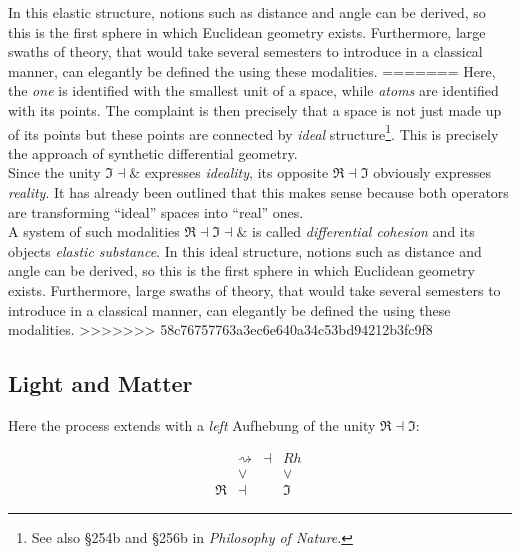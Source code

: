 \documentclass{article}
\begin{document}
In this elastic structure, notions such as distance and angle can be derived, so this is the first sphere in
which Euclidean geometry exists. Furthermore, large swaths of theory, that would take several semesters to
introduce in a classical manner, can elegantly be defined the using these modalities.
=======
Here, the \emph{one} is identified with the smallest unit of a space, while \emph{atoms} are identified
with its points. The complaint is then precisely that a space is not just made up of its points but these
points are connected by \emph{ideal} structure\footnote{See also §254b and §256b in \emph{Philosophy of
Nature}.}. This is precisely the approach of synthetic differential geometry. \\

Since the unity $\Im\dashv\&$ expresses \emph{ideality}, its opposite $\Re\dashv\Im$ obviously expresses
\emph{reality}. It has already been outlined that this makes sense because both operators are transforming
``ideal'' spaces into ``real'' ones. \\

A system of such modalities $\Re\dashv\Im\dashv\&$ is called \emph{differential cohesion} and its objects
\emph{elastic substance}. In this ideal structure, notions such as distance and angle can be derived,
so this is the first sphere in which Euclidean geometry exists. Furthermore, large swaths of theory, that
would take several semesters to introduce in a classical manner, can elegantly be defined the using these
modalities.
>>>>>>> 58c76757763a3ec6e640a34c53bd94212b3fc9f8



\subsection{Light and Matter}
Here the process extends with a \emph{left} Aufhebung of the unity $\Re\dashv\Im$: 


$$
  \begin{array}{cccc}
     & \rightsquigarrow & \dashv & Rh
    \\
     & \vee & & \vee
    \\
    \Re & \dashv & & \Im
    \end{array}
  \ 
$$
\end{document}
